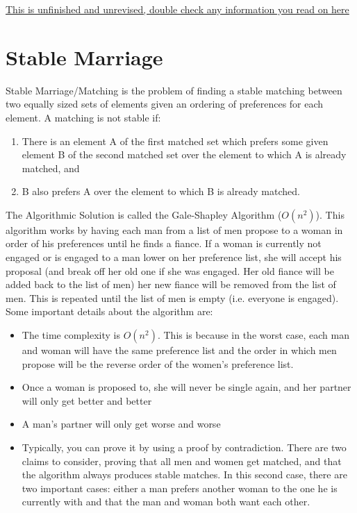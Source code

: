 \documentclass{article}
\begin{document}
\underline{This is unfinished and unrevised, double check any information you read on here}
\section{Stable Marriage}
Stable Marriage/Matching is the problem of finding a stable matching between two equally sized sets of elements given an ordering of preferences for each element.  A matching is not stable if: 

\begin{enumerate}
    \item There is an element A of the first matched set which prefers some given element B of the second matched set over the element to which A is already matched, and
    \item B also prefers A over the element to which B is already matched.
\end{enumerate}

The Algorithmic Solution is called the Gale-Shapley Algorithm ($O(n^2)$). This algorithm works by having each man from a list of men propose to a woman in order of his preferences until he finds a fiance. If a woman is currently not engaged or is engaged to a man lower on her preference list, she will accept his proposal (and break off her old one if she was engaged. Her old fiance will be added back to the list of men) her new fiance will be removed from the list of men. This is repeated until the list of men is empty (i.e. everyone is engaged). Some important details about the algorithm are:

\begin{itemize}
    \item The time complexity is $O(n^2)$. This is because in the worst case, each man and woman will have the same preference list and the order in which men propose will be the reverse order of the women's preference list.
    \item Once a woman is proposed to, she will never be single again, and her partner will only get better and better
    \item A man's partner will only get worse and worse
    \item Typically, you can prove it by using a proof by contradiction. There are two claims to
      consider, proving that all men and women get matched, and that the algorithm always produces
      stable matches. In this second case, there are two important cases: either a man prefers
      another woman to the one he is currently with and that the man and woman both want each other.
\end{itemize}
\end{document}
